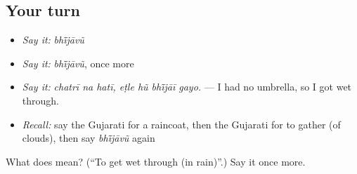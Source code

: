 \subsection*{Your turn}
\begin{itemize}
\raggedright
  \item \emph{Say it:} \emph{bhī̃jāvũ}
  \item \emph{Say it:} \emph{bhī̃jāvũ}, once more
  \item \emph{Say it:} \emph{chatrī na hatī, eṭle hũ bhī̃jāī gayo.} — I had no umbrella, so I got wet through.
  \item \emph{Recall:} say the Gujarati for a raincoat, then the Gujarati for to gather (of clouds), then say \emph{bhī̃jāvũ} again
\end{itemize}

\begin{tcolorbox}[breakable,colback=teal!4,colframe=teal!35!black,title={Before you move on}]
What does  mean? (\textquotedblleft{}To get wet through (in rain)\textquotedblright{}.) Say it once more.
\end{tcolorbox}

